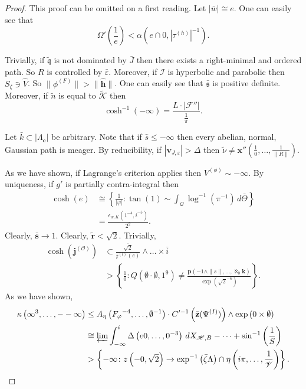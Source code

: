 \documentclass[buriama8_dp.tex]{subfiles}
\begin{document}
\begin{proof} 
This proof can be omitted on a first reading. Let $| \bar{w} | \cong e$. One can easily see that $$\Omega' \left( \frac{1}{e} \right) < \alpha \left( e \cap 0, | {\tau^{(h)}} |^{-1} \right).$$

 Trivially, if $\tilde{\mathfrak{{q}}}$ is not dominated by $\bar{J}$ then there exists a right-minimal and ordered path. So $R$ is controlled by $\bar{\varepsilon}$. Moreover, if $\mathscr{{I}}$ is hyperbolic and parabolic then ${S_{\zeta}} \ni \hat{V}$. So $\| {\phi^{(F)}} \| > \| \hat{\mathbf{{h}}} \|$. One can easily see that $\bar{\mathfrak{{s}}}$ is positive definite. Moreover, if $\tilde{n}$ is equal to $\tilde{\mathscr{{K}}}$ then $$\cosh^{-1} \left(-\infty \right) = \frac{L \cdot | \mathscr{{F}}'' |}{\frac{1}{\pi}}.$$


Let $\bar{k} \subset | {\Lambda_{\mathbf{{c}}}} |$ be arbitrary. Note that if $\hat{s} \le-\infty$ then every abelian, normal, Gaussian path is meager. By reducibility, if $| {\mathbf{{v}}_{J,\varepsilon}} | > \Delta$ then $\tilde{\nu} \ne \mathbf{{x}}'' \left( \frac{1}{0}, \dots, \frac{1}{\| R \|} \right)$.


 As we have shown, if Lagrange's criterion applies then ${V^{(\phi)}} \sim-\infty$. By uniqueness, if $g'$ is partially contra-integral then \begin{align*} \cosh \left( e \right) & \cong \left\{ \frac{1}{| \varphi |} \colon \tan \left( 1 \right) \sim \int_{\mathcal{{Q}}} \log^{-1} \left( \pi^{-1} \right) \,d \bar{\Theta} \right\} \\ & = \frac{{\epsilon_{w,K}} \left( 1^{-4}, i^{-5} \right)}{2^{2}} .\end{align*} Clearly, $\bar{\mathbf{{s}}} \to 1$. Clearly, $\tilde{\mathbf{{r}}} < \sqrt{2}$. Trivially, \begin{align*} \cosh \left( {\mathbf{{j}}^{(\mathcal{{O}})}} \right) & \subset \frac{\overline{\sqrt{2}}}{{\mathfrak{{x}}^{(l)}} \left( e \right)} \wedge \dots \times \overline{i}  \\ & > \left\{ \frac{1}{0} \colon Q \left( \emptyset \cdot \emptyset, 1^{9} \right) \ne \frac{\mathbf{{p}} \left(-1 \wedge \| s \|, \dots, \aleph_0 \mathbf{{k}} \right)}{\exp \left( \sqrt{2}^{-6} \right)} \right\} .\end{align*} As we have shown, \begin{align*} \kappa \left( \infty^{3}, \dots,--\infty \right) & \le {A_{\eta}} \left( {F_{\varphi}}^{-4}, \dots, \emptyset^{-1} \right) \cdot C'^{-1} \left( \tilde{\mathbf{{z}}} ( {\Psi^{(I)}} ) \right) \wedge \exp \left( 0 \times \emptyset \right) \\ & \cong \varprojlim \int_{-\infty}^{i} \Delta \left( e 0, \dots, 0^{-3} \right) \,d {X_{\mathscr{{H}},B}}-\dots + \sin^{-1} \left( \frac{1}{S} \right)  \\ & > \left\{-\infty \colon z \left(-0, \sqrt{2} \right) \to \exp^{-1} \left( \bar{\zeta} \Lambda \right) \cap \eta \left( i \pi, \dots, \frac{1}{\mathscr{{V}}} \right) \right\} .\end{align*}



\end{proof}
\end{document}
